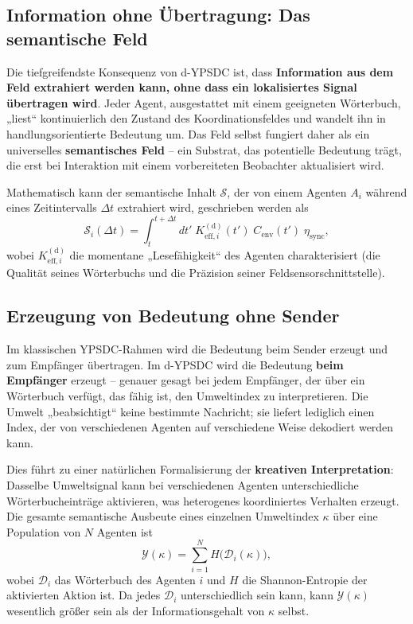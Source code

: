 \documentclass[12pt,a4paper]{article}
\theoremstyle{remark}
\begin{document}
	\subsection{Information ohne Übertragung: Das semantische Feld}
	\label{subsec:semantic-field}
	
	Die tiefgreifendste Konsequenz von d-YPSDC ist, dass \textbf{Information aus dem Feld extrahiert werden kann, ohne dass ein lokalisiertes Signal übertragen wird}. Jeder Agent, ausgestattet mit einem geeigneten Wörterbuch, „liest“ kontinuierlich den Zustand des Koordinationsfeldes und wandelt ihn in handlungsorientierte Bedeutung um. Das Feld selbst fungiert daher als ein universelles \textbf{semantisches Feld} – ein Substrat, das potentielle Bedeutung trägt, die erst bei Interaktion mit einem vorbereiteten Beobachter aktualisiert wird.
	
	Mathematisch kann der semantische Inhalt $\mathcal{S}$, der von einem Agenten $A_i$ während eines Zeitintervalls $\Delta t$ extrahiert wird, geschrieben werden als
	\begin{equation}
		\mathcal{S}_i(\Delta t) = \int_{t}^{t+\Delta t} dt' \;
		K_{\mathrm{eff},i}^{\mathrm{(d)}}(t') \; C_{\mathrm{env}}(t') \; \eta_{\mathrm{sync}},
		\label{eq:semantic-content}
	\end{equation}
	wobei $K_{\mathrm{eff},i}^{\mathrm{(d)}}$ die momentane „Lesefähigkeit“ des Agenten charakterisiert (die Qualität seines Wörterbuchs und die Präzision seiner Feldsensorschnittstelle).
	
	\subsection{Erzeugung von Bedeutung ohne Sender}
	\label{subsec:meaning-generation}
	
	Im klassischen YPSDC-Rahmen wird die Bedeutung beim Sender erzeugt und zum Empfänger übertragen. Im d-YPSDC wird die Bedeutung \textbf{beim Empfänger} erzeugt – genauer gesagt bei jedem Empfänger, der über ein Wörterbuch verfügt, das fähig ist, den Umweltindex zu interpretieren. Die Umwelt „beabsichtigt“ keine bestimmte Nachricht; sie liefert lediglich einen Index, der von verschiedenen Agenten auf verschiedene Weise dekodiert werden kann.
	
	Dies führt zu einer natürlichen Formalisierung der \textbf{kreativen Interpretation}: Dasselbe Umweltsignal kann bei verschiedenen Agenten unterschiedliche Wörterbucheinträge aktivieren, was heterogenes koordiniertes Verhalten erzeugt. Die gesamte semantische Ausbeute eines einzelnen Umweltindex $\kappa$ über eine Population von $N$ Agenten ist
	\begin{equation}
		\mathcal{Y}(\kappa) = \sum_{i=1}^{N} H\bigl(\mathcal{D}_i(\kappa)\bigr),
		\label{eq:semantic-yield}
	\end{equation}
	wobei $\mathcal{D}_i$ das Wörterbuch des Agenten $i$ und $H$ die Shannon-Entropie der aktivierten Aktion ist. Da jedes $\mathcal{D}_i$ unterschiedlich sein kann, kann $\mathcal{Y}(\kappa)$ wesentlich größer sein als der Informationsgehalt von $\kappa$ selbst.
	
\end{document}
